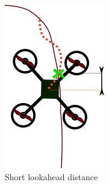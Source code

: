 \documentclass[hidelinks,BTech]{iitmdiss}
\begin{document}
\begin{figure}[H]
  \centering
  \begin{subfigure}[t]{0.3\textwidth}
    \centering
      \includegraphics[width=\textwidth]{Pure_Pursuit_short.png}
      \caption{Short lookahead distance}
  \end{subfigure}
\qquad
  \begin{subfigure}[t]{0.3\textwidth}
    \centering

\end{subfigure}
\end{figure}
\end{document}
